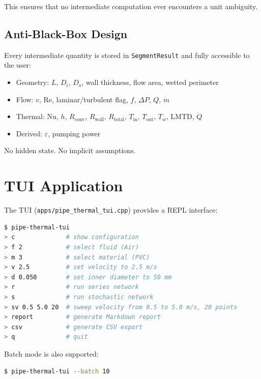 \documentclass[11pt]{article}
\begin{document}
\noindent
This ensures that no intermediate computation ever encounters a unit ambiguity.

\subsection{Anti-Black-Box Design}

Every intermediate quantity is stored in \texttt{SegmentResult} and fully
accessible to the user:

\begin{itemize}
  \item Geometry: $L$, $D_i$, $D_o$, wall thickness, flow area, wetted perimeter
  \item Flow: $v$, $\mathrm{Re}$, laminar/turbulent flag, $f$, $\Delta P$, $Q$, $\dot{m}$
  \item Thermal: $\mathrm{Nu}$, $h$, $R_{\text{conv}}$, $R_{\text{wall}}$, $R_{\text{total}}$,
        $T_{\text{in}}$, $T_{\text{out}}$, $T_w$, LMTD, $\dot{Q}$
  \item Derived: $\varepsilon$, pumping power
\end{itemize}

No hidden state.  No implicit assumptions.

\section{TUI Application}

The TUI (\texttt{apps/pipe\_thermal\_tui.cpp}) provides a REPL interface:

\begin{lstlisting}[language=bash]
$ pipe-thermal-tui
> c              # show configuration
> f 2            # select fluid (Air)
> m 3            # select material (PVC)
> v 2.5          # set velocity to 2.5 m/s
> d 0.050        # set inner diameter to 50 mm
> r              # run series network
> s              # run stochastic network
> sv 0.5 5.0 20  # sweep velocity from 0.5 to 5.0 m/s, 20 points
> report         # generate Markdown report
> csv            # generate CSV export
> q              # quit
\end{lstlisting}

Batch mode is also supported:

\begin{lstlisting}[language=bash]
$ pipe-thermal-tui --batch 10
\end{lstlisting}
\end{document}
